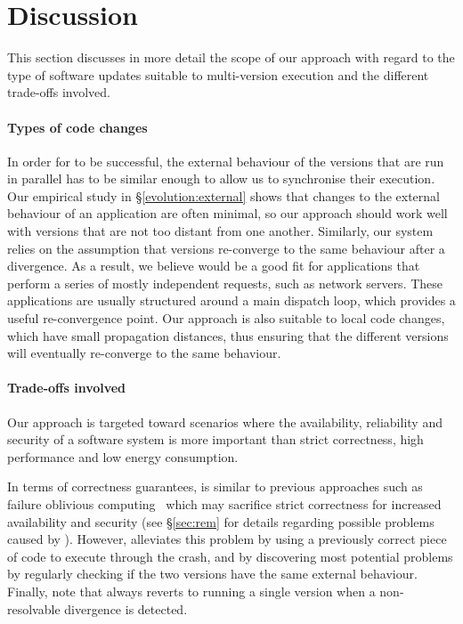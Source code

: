 \section{Discussion}
\label{safe-updates:discussion}

This section discusses in more detail the scope of our approach with
regard to the type of software updates suitable to multi-version
execution and the different trade-offs involved.


\paragraph{Types of code changes} In order for \mx to be successful, the
external behaviour of the versions that are run in parallel has to be similar
enough to allow us to synchronise their execution.  Our empirical study in
\S\ref{evolution:external} shows that changes to the external behaviour of
an application are often minimal, so our approach should work well with
versions that are not too distant from one another.  Similarly, our system
relies on the assumption that versions re-converge to the same behaviour after
a divergence.  As a result, we believe \mx would be a good fit for applications
that perform a series of mostly independent requests, such as network servers.
These applications are usually structured around a main dispatch loop, which
provides a useful re-convergence point.  Our approach is also suitable to local
code changes, which have small propagation distances, thus ensuring that the
different versions will eventually re-converge to the same behaviour.

\paragraph{Trade-offs involved} Our approach is targeted toward scenarios
where the availability, reliability and security of a software system is more
important than strict correctness, high performance and low energy consumption.  

In terms of correctness guarantees, \mx is similar to previous approaches such
as failure oblivious computing~\cite{fo} which may sacrifice strict correctness
for increased availability and security (see \S\ref{sec:rem} for details
regarding possible problems caused by \mx).  However, \mx alleviates this
problem by using a previously correct piece of code to execute through the
crash, and by discovering most potential problems by regularly checking if the
two versions have the same external behaviour.  Finally, note that \mx always
reverts to running a single version when a non-resolvable divergence is
detected.

